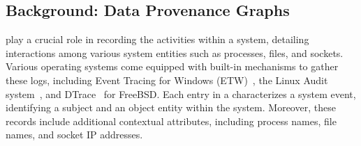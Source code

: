 


\subsection{Background: Data Provenance Graphs}




\Logs play a crucial role in recording the activities within a system, detailing interactions among various system entities such as processes, files, and sockets. Various operating systems come equipped with built-in mechanisms to gather these logs, including Event Tracing for Windows (ETW)~\cite{windowsaudit}, the Linux Audit system~\cite{linuxaudit}, and DTrace~\cite{dtrace} for FreeBSD. Each entry in a \logs characterizes a system event, identifying a subject and an object entity within the system. Moreover, these records include additional contextual attributes, including process names, file names, and socket IP addresses.


